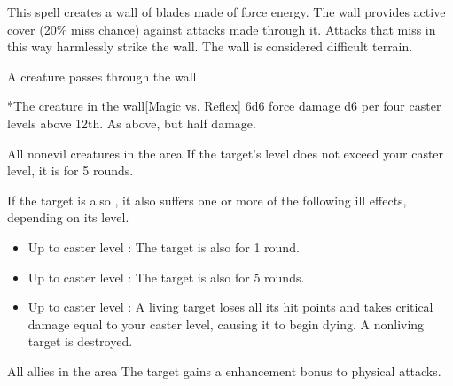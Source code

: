 \spelldur{\durshort \dismissable}
\spellline
\spelleffect This spell creates a wall of blades made of force energy. The wall provides active cover (20\% miss chance) against attacks made through it. Attacks that miss in this way harmlessly strike the wall. The wall is considered difficult terrain.
\begin{spelltrigger}{A creature passes through the wall}
    \begin{spelltarget}*{The creature in the wall}[Magic vs. Reflex]
        \spellsuccess 6d6 force damage \add d6 per four caster levels above 12th.
        \spellfailure As above, but half damage.
    \end{spelltarget}
\end{spelltrigger}

\begin{spelltargets}{All nonevil creatures in the area}
    \spelleffect If the target's level does not exceed your caster level, it is \sickened for 5 rounds.

    If the target is also \bloodied, it also suffers one or more of the following ill effects, depending on its level.
    \begin{itemize}
        \item Up to caster level : The target is also \nauseated for 1 round.
        \item Up to caster level : The target is also \paralyzed for 5 rounds.
        \item Up to caster level : A living target loses all its hit points and takes critical damage equal to your caster level, causing it to begin dying. A nonliving target is destroyed.
    \end{itemize}
\end{spelltargets}

\begin{spelltargets}{All allies in the area}
    \spelleffect The target gains a  enhancement bonus to physical attacks. \spellbonusscalingdescription
\end{spelltargets}

